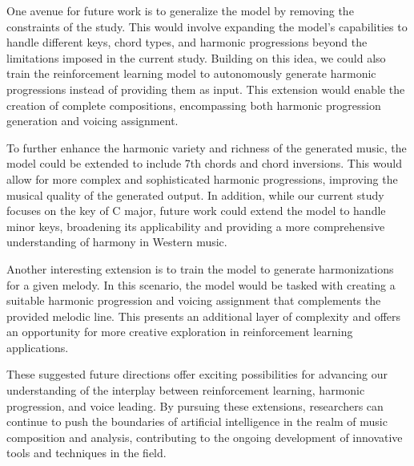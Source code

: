\documentclass[12pt, letterpaper]{article}
\begin{document}
One avenue for future work is to generalize the model by removing the constraints of the study. This would involve expanding the model's capabilities to handle different keys, chord types, and harmonic progressions beyond the limitations imposed in the current study. Building on this idea, we could also train the reinforcement learning model to autonomously generate harmonic progressions instead of providing them as input. This extension would enable the creation of complete compositions, encompassing both harmonic progression generation and voicing assignment.

To further enhance the harmonic variety and richness of the generated music, the model could be extended to include 7th chords and chord inversions. This would allow for more complex and sophisticated harmonic progressions, improving the musical quality of the generated output. In addition, while our current study focuses on the key of C major, future work could extend the model to handle minor keys, broadening its applicability and providing a more comprehensive understanding of harmony in Western music.

Another interesting extension is to train the model to generate harmonizations for a given melody. In this scenario, the model would be tasked with creating a suitable harmonic progression and voicing assignment that complements the provided melodic line. This presents an additional layer of complexity and offers an opportunity for more creative exploration in reinforcement learning applications.

These suggested future directions offer exciting possibilities for advancing our understanding of the interplay between reinforcement learning, harmonic progression, and voice leading. By pursuing these extensions, researchers can continue to push the boundaries of artificial intelligence in the realm of music composition and analysis, contributing to the ongoing development of innovative tools and techniques in the field.
\end{document}
